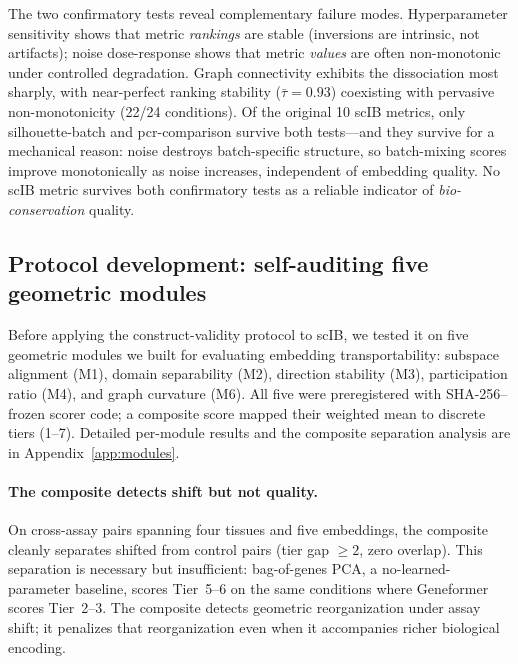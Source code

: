 \documentclass[10pt,letterpaper]{article}
\begin{document}
The two confirmatory tests reveal complementary failure modes. Hyperparameter sensitivity shows that metric \emph{rankings} are stable (inversions are intrinsic, not artifacts); noise dose-response shows that metric \emph{values} are often non-monotonic under controlled degradation. Graph connectivity exhibits the dissociation most sharply, with near-perfect ranking stability ($\bar{\tau} = 0.93$) coexisting with pervasive non-monotonicity (22/24 conditions). Of the original 10 scIB metrics, only silhouette-batch and pcr-comparison survive both tests---and they survive for a mechanical reason: noise destroys batch-specific structure, so batch-mixing scores improve monotonically as noise increases, independent of embedding quality. No scIB metric survives both confirmatory tests as a reliable indicator of \emph{bio-conservation} quality.


\subsection{Protocol development: self-auditing five geometric modules}
\label{sec:modules}

Before applying the construct-validity protocol to scIB, we tested it on five geometric modules we built for evaluating embedding transportability: subspace alignment (M1), domain separability (M2), direction stability (M3), participation ratio (M4), and graph curvature (M6). All five were preregistered with SHA-256--frozen scorer code; a composite score mapped their weighted mean to discrete tiers (1--7). Detailed per-module results and the composite separation analysis are in Appendix~\ref{app:modules}.

\paragraph{The composite detects shift but not quality.} On cross-assay pairs spanning four tissues and five embeddings, the composite cleanly separates shifted from control pairs (tier gap $\geq 2$, zero overlap). This separation is necessary but insufficient: bag-of-genes PCA, a no-learned-parameter baseline, scores Tier~5--6 on the same conditions where Geneformer scores Tier~2--3. The composite detects geometric reorganization under assay shift; it penalizes that reorganization even when it accompanies richer biological encoding.
\end{document}
